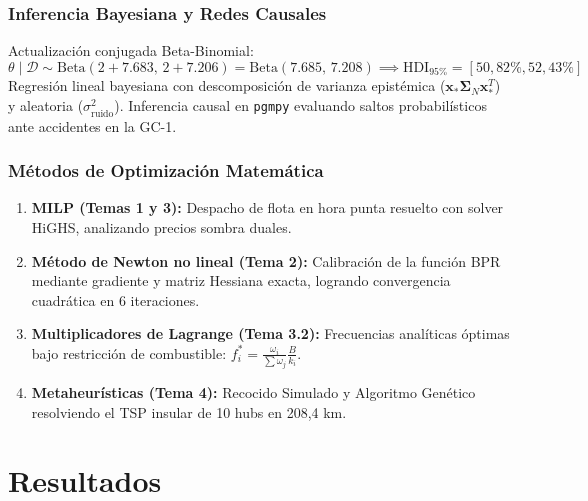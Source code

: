 \documentclass[11pt,a4paper,twoside]{report}
\begin{document}
\subsection{Inferencia Bayesiana y Redes Causales}
Actualización conjugada Beta-Binomial:
\begin{equation}
\theta \mid \mathcal{D} \sim \text{Beta}(2 + 7.683, \, 2 + 7.206) = \text{Beta}(7.685, \, 7.208) \implies \text{HDI}_{95\%} = [50,82\%, 52,43\%]
\end{equation}
Regresión lineal bayesiana con descomposición de varianza epistémica ($\mathbf{x}_* \boldsymbol{\Sigma}_N \mathbf{x}_*^T$) y aleatoria ($\sigma^2_{\text{ruido}}$). Inferencia causal en \texttt{pgmpy} evaluando saltos probabilísticos ante accidentes en la GC-1.

\subsection{Métodos de Optimización Matemática}
\begin{enumerate}
    \item \textbf{MILP (Temas 1 y 3):} Despacho de flota en hora punta resuelto con solver HiGHS, analizando precios sombra duales.
    \item \textbf{Método de Newton no lineal (Tema 2):} Calibración de la función BPR mediante gradiente y matriz Hessiana exacta, logrando convergencia cuadrática en 6 iteraciones.
    \item \textbf{Multiplicadores de Lagrange (Tema 3.2):} Frecuencias analíticas óptimas bajo restricción de combustible: $f_i^* = \frac{\omega_i}{\sum \omega_j} \frac{B}{k_i}$.
    \item \textbf{Metaheurísticas (Tema 4):} Recocido Simulado y Algoritmo Genético resolviendo el TSP insular de 10 hubs en 208,4 km.
\end{enumerate}

\chapter{Resultados}
\end{document}
